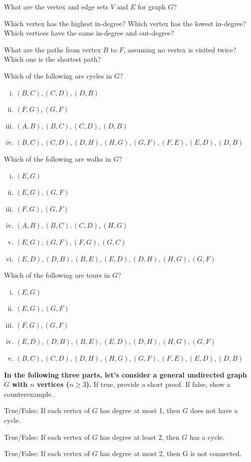 \documentclass[11pt]{article}
\begin{document}
\begin{Parts}
\Part What are the vertex and edge sets $V$ and $E$ for graph $G$?

\Part  Which vertex has the highest in-degree? Which vertex has the lowest in-degree? Which vertices have the same in-degree and out-degree?

\Part  What are the paths from vertex $B$ to $F$, assuming no vertex is visited twice? Which one is the shortest path?

\Part  Which of the following are cycles in $G$?
\begin{enumerate}[i.]
\item $(B,C), (C,D), (D,B)$
\item $(F,G), (G,F)$
\item $(A,B), (B,C), (C,D), (D,B)$
\item $(B,C), (C,D), (D,H), (H,G), (G,F), (F,E), (E,D), (D,B)$
\end{enumerate}

\Part  Which of the following are walks in $G$?
\begin{enumerate}[i.]
\item $(E,G)$
\item $(E,G), (G,F)$
\item $(F,G), (G,F)$
\item $(A,B), (B,C), (C,D), (H, G)$
\item $(E,G), (G,F), (F,G), (G,C)$
\item $(E,D), (D,B), (B,E), (E,D), (D,H), (H,G), (G,F)$
\end{enumerate}

\Part  Which of the following are tours in $G$?
\begin{enumerate}[i.]
\item $(E,G)$
\item $(E,G), (G,F)$
\item $(F,G), (G,F)$
\item $(E,D), (D,B), (B,E), (E,D), (D,H), (H,G), (G,F)$
\item $(B,C), (C,D), (D,H), (H,G), (G,F), (F,E), (E,D), (D,B)$
\end{enumerate}

\textbf{In the following three parts, let's consider a general undirected graph $G$ with $n$ vertices ($n \geq 3$).} If true, provide a short proof. If false, show a counterexample.

\Part  True/False: If each vertex of $G$ has degree at most 1, then $G$ does not have a cycle.

\Part  True/False: If each vertex of $G$ has degree at least 2, then $G$ has a cycle.

\Part  True/False: If each vertex of $G$ has degree at most 2, then G is not connected.

\end{Parts}
\end{document}
